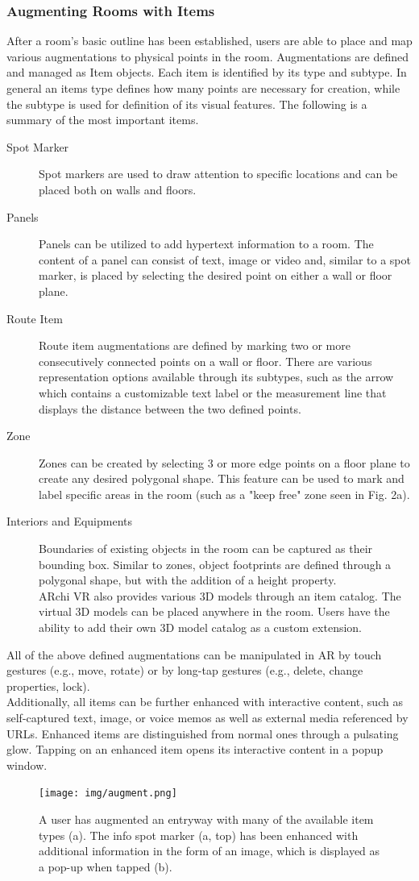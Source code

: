 \documentclass{article}
\begin{document}
\subsubsection{Augmenting Rooms with Items}
After a room's basic outline has been established, users are able to place and map various augmentations to physical points in the room. Augmentations are defined and managed as Item objects. Each item is identified by its type and subtype. In general an items type defines how many points are necessary for creation, while the subtype is used for definition of its visual features. The following is a summary of the most important items.
\begin{description}
   \item[Spot Marker] Spot markers are used to draw attention to specific locations and can be placed both on walls and floors.
   \item[Panels] Panels can be utilized to add hypertext information to a room. The content of a panel can consist of text, image or video and, similar to a spot marker, is placed by selecting the desired point on either a wall or floor plane.
   \item[Route Item] Route item augmentations are defined by marking two or more consecutively connected points on a wall or floor. There are various representation options available through its subtypes, such as the arrow which contains a customizable text label or the measurement line that displays the distance between the two defined points. 
   \item[Zone] Zones can be created by selecting 3 or more edge points on a floor plane to create any desired polygonal shape. This feature can be used to mark and label specific areas in the room (such as a "keep free" zone seen in Fig. 2a).
   \item[Interiors and Equipments] Boundaries of existing objects in the room can be captured as their bounding box. Similar to zones, object footprints are defined through a polygonal shape, but with the addition of a height property.\\
   ARchi VR also provides various 3D models through an item catalog. The virtual 3D models can be placed anywhere in the room. Users have the ability to add their own 3D model catalog as a custom extension.
\end{description}
All of the above defined augmentations can be manipulated in AR by touch gestures (e.g., move, rotate) or by long-tap gestures (e.g., delete, change properties, lock). \\
Additionally, all items can be further enhanced with interactive content, such as self-captured text, image, or voice memos as well as external media referenced by URLs. Enhanced items are distinguished from normal ones through a pulsating glow. Tapping on an enhanced item opens its interactive content in a popup window.
\begin{figure}[H]
  \centering
  \texttt{[image: img/augment.png]}
  \caption{A user has augmented an entryway with many of the available item types (a). The info spot marker (a, top) has been enhanced with additional information in the form of an image, which is displayed as a pop-up when tapped (b).}
  \label{screenshot:screenshare}
\end{figure}
\end{document}
